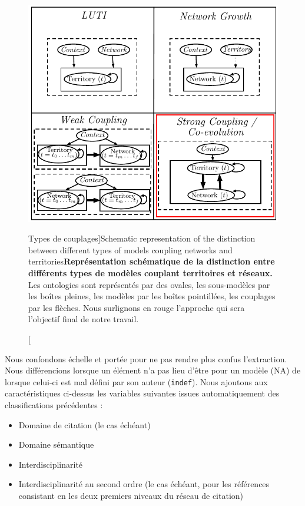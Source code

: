 \begin{figure}
\includegraphics[width=\linewidth]{Figures/Modelography/coevolution}
\caption[Coupling types][Types de couplages]{Schematic representation of the distinction between different types of models coupling networks and territories}{\textbf{Représentation schématique de la distinction entre différents types de modèles couplant territoires et réseaux.} Les ontologies sont représentés par des ovales, les sous-modèles par les boîtes pleines, les modèles par les boîtes pointillées, les couplages par les flèches. Nous surlignons en rouge l'approche qui sera l'objectif final de notre travail.}
\label{fig:modelography:coevolution}
\end{figure}


Nous confondons échelle et portée pour ne pas rendre plus confus l'extraction. Nous différencions lorsque un élément n'a pas lieu d'être pour un modèle (NA) de lorsque celui-ci est mal défini par son auteur (\texttt{indef}). Nous ajoutons aux caractéristiques ci-dessus les variables suivantes issues automatiquement des classifications précédentes :

\begin{itemize}
\item Domaine de citation (le cas échéant)
\item Domaine sémantique
\item Interdisciplinarité
\item Interdisciplinarité au second ordre (le cas échéant, pour les références consistant en les deux premiers niveaux du réseau de citation)
\end{itemize}



